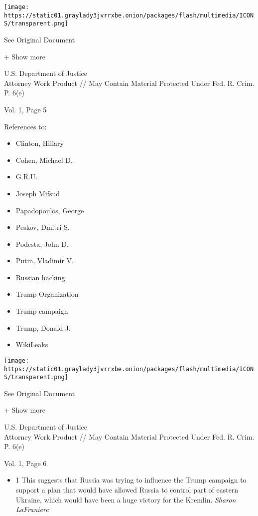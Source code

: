 \protect\hyperlink{}{}

\texttt{[image: https://static01.graylady3jvrrxbe.onion/packages/flash/multimedia/ICONS/transparent.png]}

See Original Document

+ Show more

U.S. Department of Justice\\
Attorney Work Product // May Contain Material Protected Under Fed. R.
Crim. P. 6(e)

Vol. 1, Page 5

References to:

\begin{itemize}
\tightlist
\item
  Clinton, Hillary
\item
  Cohen, Michael D.
\item
  G.R.U.
\item
  Joseph Mifsud
\item
  Papadopoulos, George
\item
  Peskov, Dmitri S.
\item
  Podesta, John D.
\item
  Putin, Vladimir V.
\item
  Russian hacking
\item
  Trump Organization
\item
  Trump campaign
\item
  Trump, Donald J.
\item
  WikiLeaks
\end{itemize}

\protect\hyperlink{}{}

\texttt{[image: https://static01.graylady3jvrrxbe.onion/packages/flash/multimedia/ICONS/transparent.png]}

See Original Document

+ Show more

U.S. Department of Justice\\
Attorney Work Product // May Contain Material Protected Under Fed. R.
Crim. P. 6(e)

Vol. 1, Page 6

\begin{itemize}
\tightlist
\item
  1 This suggests that Russia was trying to influence the Trump campaign
  to support a plan that would have allowed Russia to control part of
  eastern Ukraine, which would have been a huge victory for the Kremlin.
  \emph{Sharon LaFraniere}
\end{itemize}

